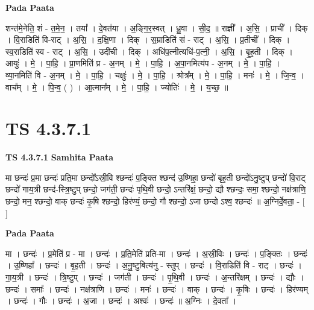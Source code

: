 \documentclass[17pt]{extarticle}
\begin{document}
\textbf{Pada Paata} \newline

शन्त॑मे॒नेति॒ शं - त॒मे॒न॒ । तया᳚ । दे॒वत॑या । अ॒ङ्गि॒र॒स्वत् । ध्रु॒वा । सी॒द॒ ॥ राज्ञी᳚ । अ॒सि॒ । प्राची᳚ । दिक् । वि॒राडिति॑ वि-राट् । अ॒सि॒ । द॒क्षि॒णा । दिक् । स॒म्राडिति॑ सं - राट् । अ॒सि॒ । प्र॒तीची᳚ । दिक् । स्व॒राडिति॑ स्व - राट् । अ॒सि॒ । उदी॑ची । दिक् । अधि॑प॒त्नीत्यधि॑-प॒त्नी॒ । अ॒सि॒ । बृ॒ह॒ती । दिक् । आयुः॑ । मे॒ । पा॒हि॒ । प्रा॒णमिति॑ प्र - अ॒नम् । मे॒ । पा॒हि॒ । अ॒पा॒नमित्य॑प - अ॒नम् । मे॒ । पा॒हि॒ । व्या॒नमिति॑ वि - अ॒नम् । मे॒ । पा॒हि॒ । चक्षुः॑ । मे॒ । पा॒हि॒ । श्रोत्र᳚म् । मे॒ । पा॒हि॒ । मनः॑ । मे॒ । जि॒न्व॒ । वाच᳚म् । मे॒ । पि॒न्व॒ ( ) । आ॒त्मान᳚म् । मे॒ । पा॒हि॒ । ज्योतिः॑ । मे॒ । य॒च्छ॒ ॥  \newline




\section*{ TS 4.3.7.1 }

\textbf{TS 4.3.7.1 } \newline
\textbf{Samhita Paata} \newline

मा छन्दः॑ प्र॒मा छन्दः॑ प्रति॒मा छन्दो᳚ऽस्री॒वि श्छन्दः॑ प॒ङ्क्ति श्छन्द॑ उ॒ष्णिहा॒ छन्दो॑ बृह॒ती छन्दो॑ऽनु॒ष्टुप् छन्दो॑ वि॒राट् छन्दो॑ गाय॒त्री छन्द॑-स्त्रि॒ष्टुप् छन्दो॒ जग॑ती॒ छन्दः॑ पृथि॒वी छन्दो॒ ऽन्तरि॑क्षं॒ छन्दो॒ द्यौ श्छन्दः॒ समा॒ श्छन्दो॒ नक्ष॑त्राणि॒ छन्दो॒ मन॒ श्छन्दो॒ वाक् छन्दः॑ कृ॒षि श्छन्दो॒ हिर॑ण्यं॒ छन्दो॒ गौ श्छन्दो॒ ऽजा छन्दो ऽश्व॒ श्छन्दः॑ ॥ अ॒ग्निर्दे॒वता॒ - [  ] \newline

\textbf{Pada Paata} \newline

मा । छन्दः॑ । प्र॒मेति॑ प्र - मा । छन्दः॑ । प्र॒ति॒मेति॑ प्रति-मा । छन्दः॑ । अ॒स्री॒विः । छन्दः॑ । प॒ङ्क्तिः । छन्दः॑ । उ॒ष्णिहा᳚ । छन्दः॑ । बृ॒ह॒ती । छन्दः॑ । अ॒नु॒ष्टुबित्य॑नु - स्तुप् । छन्दः॑ । वि॒राडिति॑ वि - राट् । छन्दः॑ । गा॒य॒त्री । छन्दः॑ । त्रि॒ष्टुप् । छन्दः॑ । जग॑ती । छन्दः॑ । पृ॒थि॒वी । छन्दः॑ । अ॒न्तरि॑क्षम् । छन्दः॑ । द्यौः । छन्दः॑ । समाः᳚ । छन्दः॑ । नक्ष॑त्राणि । छन्दः॑ । मनः॑ । छन्दः॑ । वाक् । छन्दः॑ । कृ॒षिः । छन्दः॑ । हिर॑ण्यम् । छन्दः॑ । गौः । छन्दः॑ । अ॒जा । छन्दः॑ । अश्वः॑ । छन्दः॑ ॥ अ॒ग्निः । दे॒वता᳚ ।  \newline
\end{document}
